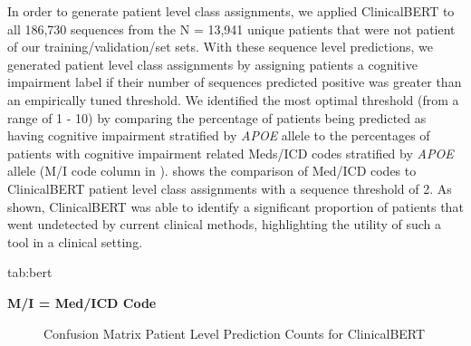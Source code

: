 \documentclass[pmlr,twocolumn,10pt]{jmlr} %
\begin{document}
In order to generate patient level class assignments, we applied ClinicalBERT to all 186,730 sequences from the N = 13,941 unique patients that were not patient of our training/validation/set sets. With these sequence level predictions, we generated patient level class assignments by assigning patients a cognitive impairment label if their number of sequences predicted positive was greater than an empirically tuned threshold. We identified the most optimal threshold (from a range of 1 - 10) by comparing the percentage of patients being predicted as having cognitive impairment stratified by \textit{APOE} allele to the percentages of patients with cognitive impairment related Meds/ICD codes stratified by \textit{APOE} allele (M/I code column in ).  shows the comparison of Med/ICD codes to ClinicalBERT patient level class assignments with a sequence threshold of 2. As shown, ClinicalBERT was able to identify a significant proportion of patients that went undetected by current clinical methods, highlighting the utility of such a tool in a clinical setting. 

\begin{table}[htb]
\floatconts
{tab:bert}
{\caption{Comparison between Other Indicators of Cognitive Impairment and ClinicalBERT}}
\centering
{}

\bfseries M/I = Med/ICD Code 
\end{table}


\begin{figure}[htb]
\caption{Confusion Matrix Patient Level Prediction Counts for ClinicalBERT}
\end{figure}
\end{document}
